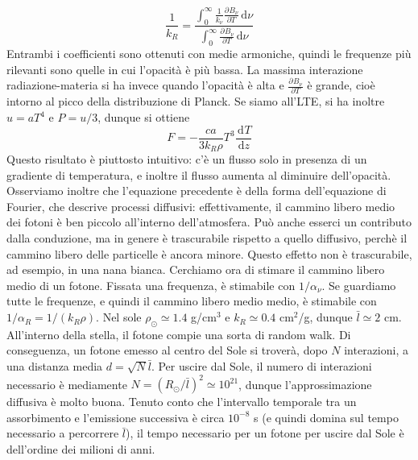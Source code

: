 \documentclass[a4paper,11pt]{article}
\renewcommand{\d}{\mathrm{d}} %
\newcommand{\der}[3][]{\frac{\d ^{#1}#2}{\d {#3}^{#1}}} %
\newcommand{\pder}[3][]{\frac{\partial ^{#1}#2}{\partial {#3}^{#1}}} %
\newcommand{\s}{_\odot}
\renewcommand{\d}{\,\mathrm{d}}
\theoremstyle{theorem}
\theoremstyle{definition}
\begin{document}
\begin{itemize}
	\[\frac{1}{k_R}=\frac{\int_{0}^{\infty}\frac{1}{k_\nu}\pder{B_\nu}{T}\d\nu}{\int_{0}^{\infty}\pder{B_\nu}{T}\d\nu}\]
	Entrambi i coefficienti sono ottenuti con medie armoniche, quindi le frequenze più rilevanti sono quelle in cui l'opacità è più bassa. La massima interazione radiazione-materia si ha invece quando l'opacità è alta e $\pder{B_\nu}{T}$ è grande, cioè intorno al picco della distribuzione di Planck. Se siamo all'LTE, si ha inoltre $u=aT^4$ e $P=u/3$, dunque si ottiene
	\[F=-\frac{ca}{3k_R\rho}T^3\der{T}{z}\]
	Questo risultato è piuttosto intuitivo: c'è un flusso solo in presenza di un gradiente di temperatura, e inoltre il flusso aumenta al diminuire dell'opacità. Osserviamo inoltre che l'equazione precedente è della forma dell'equazione di Fourier, che descrive processi diffusivi: effettivamente, il cammino libero medio dei fotoni è ben piccolo all'interno dell'atmosfera. Può anche esserci un contributo dalla conduzione, ma in genere è trascurabile rispetto a quello diffusivo, perchè il cammino libero delle particelle è ancora minore. Questo effetto non è trascurabile, ad esempio, in una nana bianca. Cerchiamo ora di stimare il cammino libero medio di un fotone. Fissata una frequenza, è stimabile con $1/\alpha_\nu$. Se guardiamo tutte le frequenze, e quindi il cammino libero medio medio, è stimabile con $1/\alpha_R=1/(k_R\rho)$. Nel sole $\rho\s\simeq1.4$ g/cm$^3$ e $k_R\simeq 0.4$ cm$^2$/g, dunque $\bar{l}\simeq 2$ cm. All'interno della stella, il fotone compie una sorta di random walk. Di conseguenza, un fotone emesso al centro del Sole si troverà, dopo $N$ interazioni, a una distanza media $d=\sqrt{N}\bar{l}$. Per uscire dal Sole, il numero di interazioni necessario è mediamente $N=(R\s/\bar{l})^2\simeq10^{21}$, dunque l'approssimazione diffusiva è molto buona. Tenuto conto che l'intervallo temporale tra un assorbimento e l'emissione successiva è circa $10^{-8}$ s (e quindi domina sul tempo necessario a percorrere $\bar{l}$), il tempo necessario per un fotone per uscire dal Sole è dell'ordine dei milioni di anni.
	\end{itemize}
\end{document}
